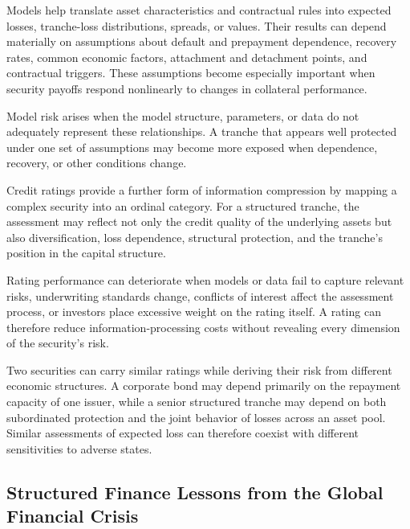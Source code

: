 Models help translate asset characteristics and contractual rules into expected losses, tranche-loss distributions, spreads, or values. Their results can depend materially on assumptions about default and prepayment dependence, recovery rates, common economic factors, attachment and detachment points, and contractual triggers. These assumptions become especially important when security payoffs respond nonlinearly to changes in collateral performance.

Model risk arises when the model structure, parameters, or data do not adequately represent these relationships. A tranche that appears well protected under one set of assumptions may become more exposed when dependence, recovery, or other conditions change.

Credit ratings provide a further form of information compression by mapping a complex security into an ordinal category. For a structured tranche, the assessment may reflect not only the credit quality of the underlying assets but also diversification, loss dependence, structural protection, and the tranche's position in the capital structure.

Rating performance can deteriorate when models or data fail to capture relevant risks, underwriting standards change, conflicts of interest affect the assessment process, or investors place excessive weight on the rating itself. A rating can therefore reduce information-processing costs without revealing every dimension of the security's risk.

\begin{tcolorbox}[
  enhanced,
  breakable,
  colback=white,
  colframe=FinanceBlue,
  boxrule=0.7pt,
  sharp corners,
  borderline west={2.2pt}{0pt}{FinanceBlue},
  title=\textbf{Financial Perspective: A Rating Does Not Reveal the Shape of Tail Risk},
  coltitle=white,
  colbacktitle=FinanceBlue,
  fonttitle=\bfseries,
  before skip=1.2em,
  after skip=1.2em
]

Two securities can carry similar ratings while deriving their risk from different economic structures. A corporate bond may depend primarily on the repayment capacity of one issuer, while a senior structured tranche may depend on both subordinated protection and the joint behavior of losses across an asset pool. Similar assessments of expected loss can therefore coexist with different sensitivities to adverse states.

\end{tcolorbox}

\subsection[Structured Finance Lessons from the Global Financial Crisis]{Structured Finance Lessons from the Global Financial Crisis}

